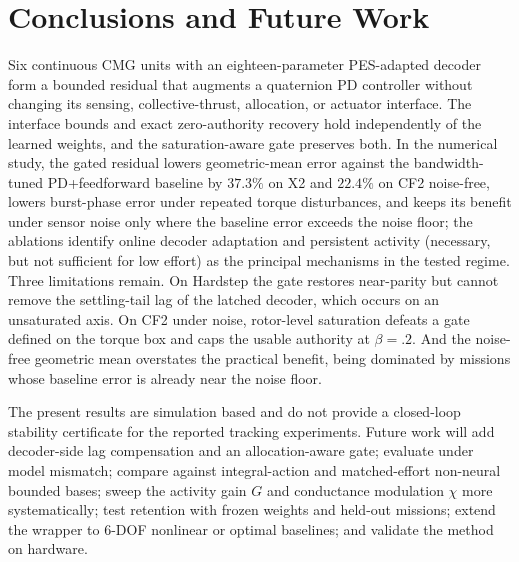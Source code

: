 \documentclass[letterpaper, 10 pt, conference]{ieeeconf}
\begin{document}
\section{Conclusions and Future Work}
\label{sec:conclusion}
Six continuous CMG units with an eighteen-parameter PES-adapted decoder form a bounded residual that augments a quaternion PD controller without changing its sensing, collective-thrust, allocation, or actuator interface. The interface bounds and exact zero-authority recovery hold independently of the learned weights, and the saturation-aware gate preserves both. In the numerical study, the gated residual lowers geometric-mean error against the bandwidth-tuned PD+feedforward baseline by $37.3\%$ on X2 and $22.4\%$ on CF2 noise-free, lowers burst-phase error under repeated torque disturbances, and keeps its benefit under sensor noise only where the baseline error exceeds the noise floor; the ablations identify online decoder adaptation and persistent activity (necessary, but not sufficient for low effort) as the principal mechanisms in the tested regime. Three limitations remain. On Hardstep the gate restores near-parity but cannot remove the settling-tail lag of the latched decoder, which occurs on an unsaturated axis. On CF2 under noise, rotor-level saturation defeats a gate defined on the torque box and caps the usable authority at $\beta=.2$. And the noise-free geometric mean overstates the practical benefit, being dominated by missions whose baseline error is already near the noise floor.

The present results are simulation based and do not provide a closed-loop stability certificate for the reported tracking experiments. Future work will add decoder-side lag compensation and an allocation-aware gate; evaluate under model mismatch; compare against integral-action and matched-effort non-neural bounded bases; sweep the activity gain $G$ and conductance modulation $\chi$ more systematically; test retention with frozen weights and held-out missions; extend the wrapper to 6-DOF nonlinear or optimal baselines; and validate the method on hardware.



\end{document}
